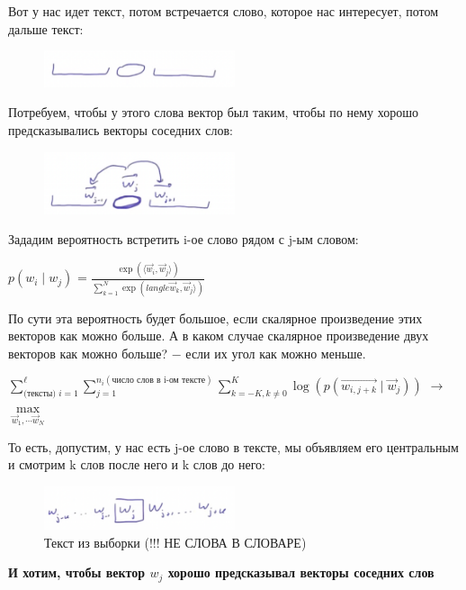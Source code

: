                 Вот у нас идет текст, потом встречается слово, которое нас интересует, потом дальше текст:
                \begin{figure}[H]
                    \centering
                    \includegraphics[width=0.5\textwidth]{images/13lecture/word2vec1.png}
                \end{figure}
                Потребуем, чтобы у этого слова вектор был таким, чтобы по нему хорошо предсказывались векторы соседних слов:
                \begin{figure}[H]
                    \centering
                    \includegraphics[width=0.5\textwidth]{images/13lecture/word2vec2.png}
                \end{figure}
                Зададим вероятность встретить i-ое слово рядом с j-ым словом:
                \begin{center}
                \large
                    $p(w_i \mid w_j)$ = $\frac{\exp(\langle \vec{w}_i, \vec{w}_j \rangle)}{\sum\limits_{k = 1}^N\exp(langle \vec{w}_k, \vec{w}_j \rangle)}$
                \end{center}
                По сути эта вероятность будет большое, если скалярное произведение этих векторов как можно больше. А в каком случае скалярное произведение двух векторов как можно больше? $-$ если их угол как можно меньше.\\


                \begin{center}
                \Large
                    $\sum\limits_{\text{(тексты) }i = 1}^\ell\sum\limits_{j = 1}^{n_i (\text{число слов в i-ом тексте})}\sum\limits_{k = -K, k \neq 0}^K\log(p(\vec{w_{i, j+k}} \mid \vec{w}_j))$ $\longrightarrow$ $\max\limits_{\vec{w}_1, \cdots \vec{w}_N }$
                \end{center}

                То есть, допустим, у нас есть j-ое слово в тексте, мы объявляем его центральным и смотрим k слов после него и k слов до него:
                \begin{figure}[H]
                    \centering
                    \includegraphics[width=0.5\textwidth]{images/13lecture/word2vec3.png}
                    \caption{Текст из выборки (!!! НЕ СЛОВА В СЛОВАРЕ)}
                \end{figure}
                \textbf{И хотим, чтобы вектор $w_j$ хорошо предсказывал векторы соседних слов }

